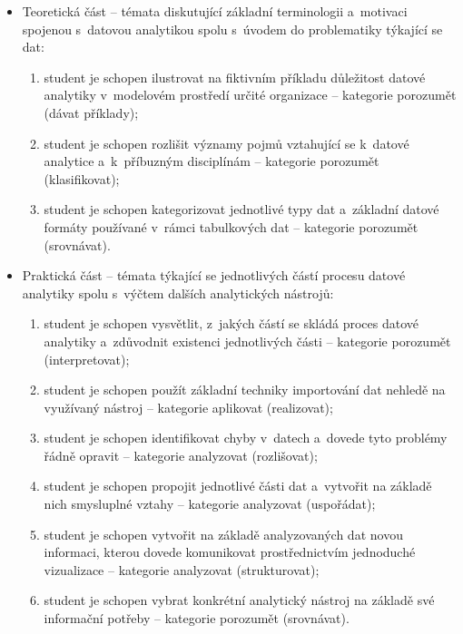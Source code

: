 \begin{itemize}
\tightlist
\item
  Teoretická část -- témata diskutující základní terminologii a~motivaci spojenou s~datovou analytikou spolu s~úvodem do problematiky týkající se dat:

  \begin{enumerate}
  \def\labelenumi{\arabic{enumi}.}
  \tightlist
  \item
    student je schopen ilustrovat na fiktivním příkladu důležitost datové analytiky v~modelovém prostředí určité organizace -- kategorie porozumět (dávat příklady);
  \item
    student je schopen rozlišit významy pojmů vztahující se k~datové analytice a~k~příbuzným disciplínám -- kategorie porozumět (klasifikovat);
  \item
    student je schopen kategorizovat jednotlivé typy dat a~základní datové formáty používané v~rámci tabulkových dat -- kategorie porozumět (srovnávat).
  \end{enumerate}
\item
  Praktická část -- témata týkající se jednotlivých částí procesu datové analytiky spolu s~výčtem dalších analytických nástrojů:

  \begin{enumerate}
  \def\labelenumi{\arabic{enumi}.}
  \setcounter{enumi}{3}
  \tightlist
  \item
    student je schopen vysvětlit, z~jakých částí se skládá proces datové analytiky a~zdůvodnit existenci jednotlivých části -- kategorie porozumět (interpretovat);
  \item
    student je schopen použít základní techniky importování dat nehledě na využívaný nástroj -- kategorie aplikovat (realizovat);
  \item
    student je schopen identifikovat chyby v~datech a~dovede tyto problémy řádně opravit -- kategorie analyzovat (rozlišovat);
  \item
    student je schopen propojit jednotlivé části dat a~vytvořit na základě nich smysluplné vztahy -- kategorie analyzovat (uspořádat);
  \item
    student je schopen vytvořit na základě analyzovaných dat novou informaci, kterou dovede komunikovat prostřednictvím jednoduché vizualizace -- kategorie analyzovat (strukturovat);
  \item
    student je schopen vybrat konkrétní analytický nástroj na základě své informační potřeby -- kategorie porozumět (srovnávat).
  \end{enumerate}
\end{itemize}


